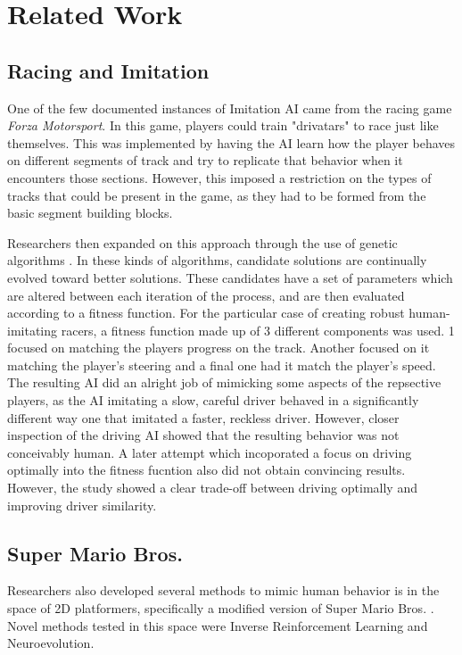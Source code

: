 \chapter{Related Work} %

\label{Chapter2} %

\section{Racing and Imitation}
One of the few documented instances of Imitation AI came from the racing game \textit{Forza Motorsport}. In this game, players could train "drivatars" to race just like themselves. This was implemented by having the AI learn how the player behaves on different segments of track and try to replicate that behavior when it encounters those sections. However, this imposed a restriction on the types of tracks that could be present in the game, as they had to be formed from the basic segment building blocks.

Researchers then expanded on this approach through the use of genetic algorithms \parencite{DrivingPlayerModeler}. In these kinds of algorithms, candidate solutions are continually evolved toward better solutions. These candidates have a set of parameters which are altered between each iteration of the process, and are then evaluated according to a fitness function. For the particular case of creating robust human-imitating racers, a fitness function made up of 3 different components was used. 1 focused on matching the players progress on the track. Another focused on it matching the player's steering and a final one had it match the player's speed. The resulting AI did an alright job of mimicking some aspects of the repsective players, as the AI imitating a slow, careful driver behaved in a significantly different way one that imitated a faster, reckless driver. However, closer inspection of the driving AI showed that the resulting behavior was not conceivably human. A later attempt which incoporated a focus on driving optimally into the fitness fucntion also did not obtain convincing results. However, the study showed a clear trade-off between driving optimally and improving driver similarity. \parencite{MultiObjectiveMimic}

\section{Super Mario Bros.}
Researchers also developed several methods to mimic human behavior is in the space of 2D platformers, specifically a modified version of Super Mario Bros. \parencite{MarioImitation}. Novel methods tested in this space were Inverse Reinforcement Learning and Neuroevolution. 

